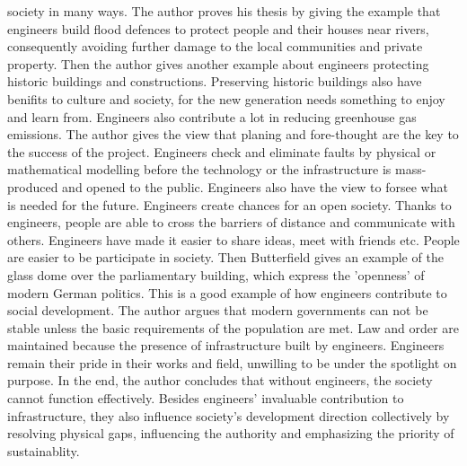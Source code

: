 \documentclass[12pt,a4]{article}
\begin{document}
society in many ways.
The author proves his thesis by giving the example that engineers build flood
defences to protect people and their houses near rivers, consequently avoiding
further damage to the local communities and private property.
Then the author gives another example about engineers protecting historic
buildings and constructions.
Preserving historic buildings also have benifits to culture and society, for the
new generation needs something to enjoy and learn from.
Engineers also contribute a lot in reducing greenhouse gas emissions.
%
%
The author gives the view that planing and fore-thought are the key to the
success of the project.
Engineers check and eliminate faults by physical or mathematical modelling
before the technology or the infrastructure is mass-produced and opened to the
public.
Engineers also have the view to forsee what is needed for the future.
%
%
Engineers create chances for an open society.
Thanks to engineers, people are able to cross the barriers of distance and
communicate with others.
Engineers have made it easier to share ideas, meet with friends etc.
People are easier to be participate in society.
Then Butterfield gives an example of the glass dome over the parliamentary
building, which express the 'openness' of modern German politics.
This is a good example of how engineers contribute to social development.
The author argues that modern governments can not be stable unless the basic
requirements of the population are met.
Law and order are maintained because the presence of infrastructure built by
engineers.
%
%
Engineers remain their pride in their works and field, unwilling to be under the
spotlight on purpose.
% 
%
In the end, the author concludes that without engineers, the society cannot
function effectively.
Besides engineers' invaluable contribution to infrastructure, they also
influence society's development direction collectively by resolving physical
gaps, influencing the authority and emphasizing the priority of sustainablity.
%
%
%
%
%

\newpage


\end{document}

